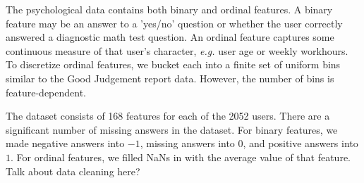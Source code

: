 \documentclass{article}
\begin{document}
The psychological data contains both binary and ordinal features. A binary feature may be an answer to a 'yes/no' question or whether the user correctly answered a diagnostic math test question. An ordinal feature captures some continuous measure of that user's character, \textit{e.g.} user age or weekly workhours. To discretize ordinal features, we bucket each into a finite set of uniform bins similar to the Good Judgement report data. However, the number of bins is feature-dependent. 

The dataset consists of 168 features for each of the 2052 users. There are a significant number of missing answers in the dataset. For binary features, we made negative answers into $-1$, missing answers into $0$, and positive answers into $1$. For ordinal features, we filled NaNs in with the average value of that feature. {\color{red} Talk about data cleaning here?}
\end{document}
